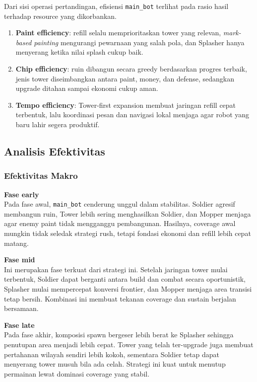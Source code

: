 Dari sisi operasi pertandingan, efisiensi \texttt{main\_bot} terlihat pada rasio hasil terhadap resource yang dikorbankan.

\begin{enumerate}
    \item \textbf{Paint efficiency}: refill selalu memprioritaskan tower yang relevan, \textit{mark-based painting} mengurangi pewarnaan yang salah pola, dan Splasher hanya menyerang ketika nilai splash cukup baik.
    \item \textbf{Chip efficiency}: ruin dibangun secara greedy berdasarkan progres terbaik, jenis tower diseimbangkan antara paint, money, dan defense, sedangkan upgrade ditahan sampai ekonomi cukup aman.
    \item \textbf{Tempo efficiency}: Tower-first expansion membuat jaringan refill cepat terbentuk, lalu koordinasi pesan dan navigasi lokal menjaga agar robot yang baru lahir segera produktif.
\end{enumerate}

\subsection{Analisis Efektivitas}

\subsubsection{Efektivitas Makro}

\textbf{Fase early}\\
Pada fase awal, \texttt{main\_bot} cenderung unggul dalam stabilitas. Soldier agresif membangun ruin, Tower lebih sering menghasilkan Soldier, dan Mopper menjaga agar enemy paint tidak mengganggu pembangunan. Hasilnya, coverage awal mungkin tidak seledak strategi rush, tetapi fondasi ekonomi dan refill lebih cepat matang.

\textbf{Fase mid}\\
Ini merupakan fase terkuat dari strategi ini. Setelah jaringan tower mulai terbentuk, Soldier dapat berganti antara build dan combat secara oportunistik, Splasher mulai mempercepat konversi frontier, dan Mopper menjaga area transisi tetap bersih. Kombinasi ini membuat tekanan coverage dan sustain berjalan bersamaan.

\textbf{Fase late}\\
Pada fase akhir, komposisi spawn bergeser lebih berat ke Splasher sehingga penutupan area menjadi lebih cepat. Tower yang telah ter-upgrade juga membuat pertahanan wilayah sendiri lebih kokoh, sementara Soldier tetap dapat menyerang tower musuh bila ada celah. Strategi ini kuat untuk menutup permainan lewat dominasi coverage yang stabil.

